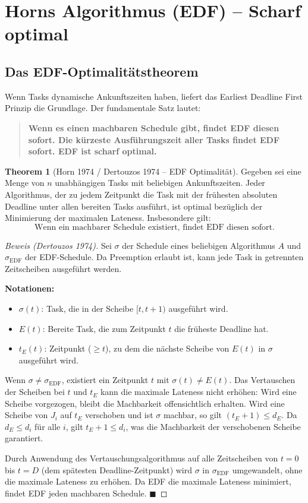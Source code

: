 ﻿\documentclass[a4paper,12pt]{report}
\theoremstyle{definition}
\newtheorem{theorem}{Theorem}[chapter]
\begin{document}
\section{Horns Algorithmus (EDF) -- Scharf optimal}

\subsection{Das EDF-Optimalitätstheorem}

Wenn Tasks dynamische Ankunftszeiten haben, liefert das Earliest Deadline First
Prinzip die Grundlage. Der fundamentale Satz lautet:

\begin{quote}
\textbf{Wenn es einen machbaren Schedule gibt, findet EDF diesen sofort. Die kürzeste
Ausführungszeit aller Tasks findet EDF sofort. EDF ist scharf optimal.}
\end{quote}

\begin{theorem}[Horn 1974 / Dertouzos 1974 -- EDF Optimalität]
	\label{thm:edf_optimal}
	Gegeben sei eine Menge von $n$ unabhängigen Tasks mit beliebigen Ankunftszeiten.
	Jeder Algorithmus, der zu jedem Zeitpunkt die Task mit der frühesten absoluten
	Deadline unter allen bereiten Tasks ausführt, ist optimal bezüglich der
	Minimierung der maximalen Lateness. Insbesondere gilt:
	\[
		\text{Wenn ein machbarer Schedule existiert, findet EDF diesen sofort.}
	\]
\end{theorem}

\begin{proof}[Beweis (Dertouzos 1974)]
	Sei $\sigma$ der Schedule eines beliebigen Algorithmus $A$ und $\sigma_{\text{EDF}}$
	der EDF-Schedule. Da Preemption erlaubt ist, kann jede Task in getrennten
	Zeitscheiben ausgeführt werden.

	\textbf{Notationen:}
	\begin{itemize}
		\item $\sigma(t)$: Task, die in der Scheibe $[t, t+1)$ ausgeführt wird.
		\item $E(t)$: Bereite Task, die zum Zeitpunkt $t$ die früheste Deadline hat.
		\item $t_E(t)$: Zeitpunkt ($\geq t$), zu dem die nächste Scheibe von $E(t)$
		      in $\sigma$ ausgeführt wird.
	\end{itemize}

	Wenn $\sigma \neq \sigma_{\text{EDF}}$, existiert ein Zeitpunkt $t$ mit
	$\sigma(t) \neq E(t)$. Das Vertauschen der Scheiben bei $t$ und $t_E$ kann die
	maximale Lateness nicht erhöhen: Wird eine Scheibe vorgezogen, bleibt die
	Machbarkeit offensichtlich erhalten. Wird eine Scheibe von $J_i$ auf $t_E$
	verschoben und ist $\sigma$ machbar, so gilt $(t_E + 1) \leq d_E$. Da
	$d_E \leq d_i$ für alle $i$, gilt $t_E + 1 \leq d_i$, was die Machbarkeit
	der verschobenen Scheibe garantiert.

	Durch Anwendung des Vertauschungsalgorithmus auf alle Zeitscheiben von $t=0$
	bis $t=D$ (dem spätesten Deadline-Zeitpunkt) wird $\sigma$ in $\sigma_{\text{EDF}}$
	umgewandelt, ohne die maximale Lateness zu erhöhen. Da EDF die maximale
	Lateness minimiert, findet EDF jeden machbaren Schedule. \hfill$\blacksquare$
\end{proof}
\end{document}
